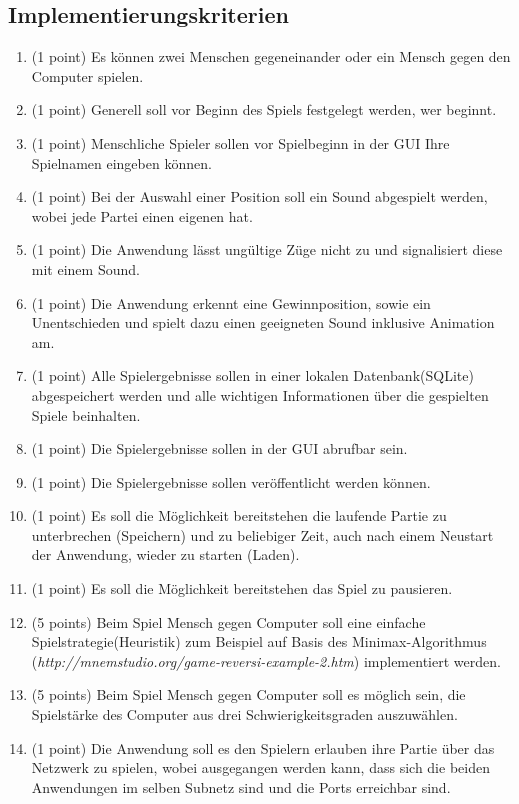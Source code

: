 \documentclass[a4paper]{scrartcl}
\begin{document}
\subsection{Implementierungskriterien}
	\begin{enumerate}
		\item (1 point) Es können zwei Menschen gegeneinander oder ein Mensch gegen den Computer spielen.
		\item (1 point) Generell soll vor Beginn des Spiels festgelegt werden, wer beginnt.
		\item (1 point) Menschliche Spieler sollen vor Spielbeginn in der GUI Ihre Spielnamen eingeben können.
		\item (1 point) Bei der Auswahl einer Position soll ein Sound abgespielt werden, wobei jede Partei einen eigenen hat.
		\item (1 point) Die Anwendung lässt ungültige Züge nicht zu und signalisiert diese mit einem Sound.
		\item (1 point) Die Anwendung erkennt eine Gewinnposition, sowie ein Unentschieden und spielt dazu einen geeigneten Sound inklusive Animation am.
		\item (1 point) Alle Spielergebnisse sollen in einer lokalen Datenbank(SQLite) abgespeichert werden und alle wichtigen Informationen über die gespielten Spiele beinhalten.
		\item (1 point) Die Spielergebnisse sollen in der GUI abrufbar sein.
		\item (1 point) Die Spielergebnisse sollen veröffentlicht werden können.
		\item (1 point) Es soll die Möglichkeit bereitstehen die laufende Partie zu unterbrechen (Speichern) und zu beliebiger Zeit, auch nach einem Neustart der Anwendung, wieder zu starten (Laden).
		\item (1 point) Es soll die Möglichkeit bereitstehen das Spiel zu pausieren.
		\item (5 points) Beim Spiel Mensch gegen Computer soll eine einfache Spielstrategie(Heuristik) zum Beispiel auf Basis des Minimax-Algorithmus (\textit{http://mnemstudio.org/game-reversi-example-2.htm}) implementiert werden.	
		\item (5 points) Beim Spiel Mensch gegen Computer soll es möglich sein, die Spielstärke des Computer aus drei Schwierigkeitsgraden auszuwählen.
		\item (1 point) Die Anwendung soll es den Spielern erlauben ihre Partie über das Netzwerk zu spielen, wobei ausgegangen werden kann, dass sich die beiden Anwendungen im selben Subnetz sind und die Ports erreichbar sind.

\end{enumerate}
\end{document}
